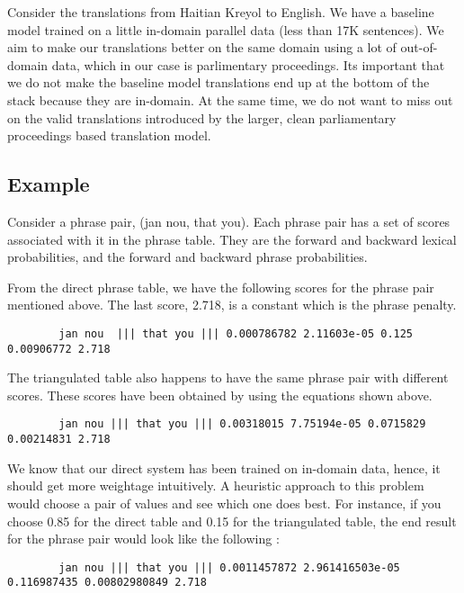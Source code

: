 	Consider the translations from Haitian Kreyol to English. We have a baseline model trained on a little in-domain parallel data (less than 17K sentences). We aim to make our translations better on the same domain using a lot of out-of-domain data, which in our case is parlimentary proceedings. Its important that we do not make the baseline model translations end up at the bottom of the stack because they are in-domain. At the same time, we do not want to miss out on the valid translations introduced by the larger, clean parliamentary proceedings based translation model. 

	\subsection{Example}
		Consider a phrase pair, (jan nou, that you). Each phrase pair has a set of scores associated with it in the phrase table. They are the forward and backward lexical probabilities, and the forward and backward phrase probabilities. 

		From the direct phrase table, we have the following scores for the phrase pair mentioned above. The last score, 2.718, is a constant which is the phrase penalty. 
	\begin{verbatim}
		jan nou  ||| that you ||| 0.000786782 2.11603e-05 0.125 0.00906772 2.718 
	\end{verbatim}

		The triangulated table also happens to have the same phrase pair with different scores. These scores have been obtained by using the equations shown above.
	\begin{verbatim}
		jan nou ||| that you ||| 0.00318015 7.75194e-05 0.0715829 0.00214831 2.718
	\end{verbatim}

		We know that our direct system has been trained on in-domain data, hence, it should get more weightage intuitively. A heuristic approach to this problem would choose a pair of values and see which one does best. For instance, if you choose 0.85 for the direct table and 0.15 for the triangulated table, the end result for the phrase pair would look like the following : 

	\begin{verbatim}
		jan nou ||| that you ||| 0.0011457872 2.961416503e-05 0.116987435 0.00802980849 2.718	
	\end{verbatim}

